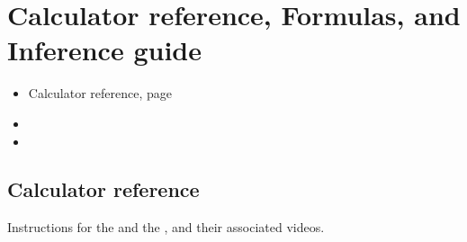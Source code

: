 \chapter{Calculator reference, Formulas, and Inference guide}

\begin{itemize}
\item Calculator reference, page~\pageref{calculatorIndex}
\item {}
\item {}
\end{itemize}

\newpage

\vspace{-55mm}

\section{Calculator reference}
\label{calculatorIndex}
Instructions for the  and the , and their associated videos.

